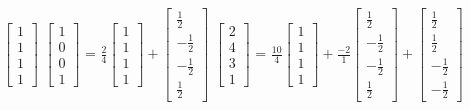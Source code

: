\begin{tbox}
        \hspace{0.5cm}
        \scriptsize
        $\begin{bmatrix}
            1 \\
            1 \\
            1 \\
            1 
        \end{bmatrix}$
        \hspace{2cm}
        $\begin{bmatrix}
            1 \\
            0 \\
            0 \\
            1
        \end{bmatrix}$ =
        $\frac{2}{4}
        \begin{bmatrix}
            1 \\
            1 \\
            1 \\
            1
        \end{bmatrix} +
        \begin{bmatrix}
            \frac{1}{2} \\
            -\frac{1}{2} \\
            -\frac{1}{2} \\
            \frac{1}{2}
        \end{bmatrix}$
        \hspace{2cm}
        $\begin{bmatrix}
            2 \\
            4 \\
            3 \\
            1
        \end{bmatrix}$ =
        $\frac{10}{4}
        \begin{bmatrix}
            1 \\
            1 \\
            1 \\
            1
        \end{bmatrix} +
        \frac{-2}{1}
        \begin{bmatrix}
            \frac{1}{2} \\
            -\frac{1}{2} \\
            -\frac{1}{2} \\
            \frac{1}{2}
        \end{bmatrix} +
        \begin{bmatrix}
            \frac{1}{2} \\
            \frac{1}{2} \\
            -\frac{1}{2} \\
            -\frac{1}{2}
        \end{bmatrix}$


\end{tbox}
